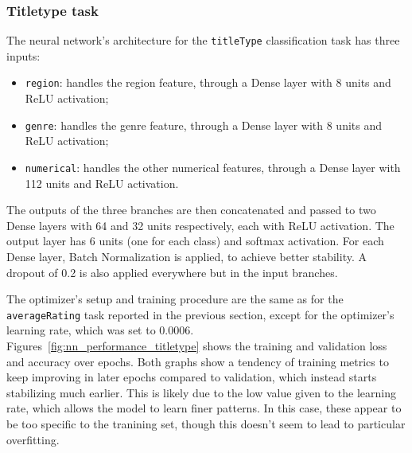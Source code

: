 \subsubsection{Titletype task}
The neural network's architecture for the \texttt{titleType}
classification task has three inputs:
\begin{itemize}
    \item \texttt{region}: handles the region feature, through
    a Dense layer with 8 units and ReLU activation;
    \item \texttt{genre}: handles the genre feature, through
    a Dense layer with 8 units and ReLU activation;
    \item \texttt{numerical}: handles the other numerical
    features, through a Dense layer with 112 units and ReLU
    activation.
\end{itemize}
The outputs of the three branches are then concatenated and
passed to two Dense layers with 64 and 32 units respectively,
each with ReLU activation.
The output layer has 6 units (one for each class) and
softmax activation.
For each Dense layer, Batch Normalization is applied,
to achieve better stability.
A dropout of 0.2 is also applied everywhere but in the input
branches.

The optimizer's setup and training procedure are the same as for
the \texttt{averageRating} task reported in the previous section,
except for the optimizer's learning rate, which was set to
0.0006.\\

Figures~\ref{fig:nn_performance_titletype} shows the training and
validation loss and accuracy over epochs.
Both graphs show a tendency of training metrics to keep improving
in later epochs compared to validation, which instead starts
stabilizing much earlier. This is likely due to the low
value given to the learning rate, which allows the model
to learn finer patterns. In this case, these appear to be too
specific to the tranining set, though this doesn't seem to lead
to particular overfitting.


